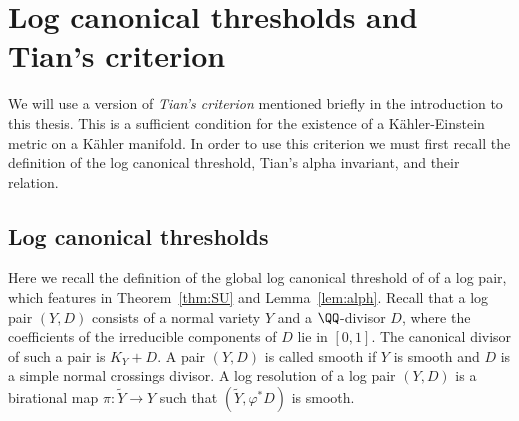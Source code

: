 \section{Log canonical thresholds and Tian's criterion}
We will use a version of \textit{Tian's criterion} mentioned briefly in the introduction to this thesis. This is a sufficient condition for the existence of a K\"ahler-Einstein metric on a K\"ahler manifold. In order to use this criterion we must first recall the definition of the log canonical threshold, Tian's alpha invariant, and their relation.
\subsection{Log canonical thresholds}
Here we recall the definition of the global log canonical threshold of of a log pair, which features in Theorem~\ref{thm:SU} and Lemma~\ref{lem:alph}. Recall that a log pair \((Y,D)\) consists of a normal variety \(Y\) and a \(\QQ\)-divisor \(D\), where the coefficients of the irreducible components of \(D\) lie in \([0,1]\). The canonical divisor of such a pair is \(K_Y+D\). A pair \((Y,D)\) is called smooth if \(Y\) is smooth and \(D\) is a simple normal crossings divisor. A log resolution of a log pair \((Y,D)\) is a birational map \(\pi: \tilde{Y} \to Y\) such that \((\tilde{Y},\varphi^*D)\) is smooth.

